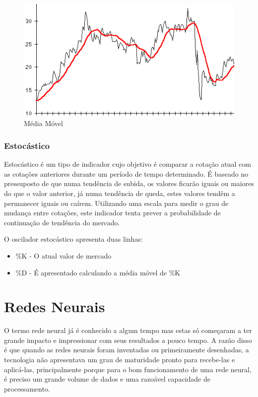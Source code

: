 \begin{figure}[h]
	\centering
	\includegraphics[keepaspectratio=true,scale=0.7]{figuras/mov.png}
	\caption{Média Móvel \cite{investopedia}}
	\label{fig07}
\end{figure}

\subsubsection{Estocástico}

Estocástico é um tipo de indicador cujo objetivo é comparar a cotação atual com as cotações anteriores durante um período de tempo determinado.
É baseado no pressuposto de que numa tendência de subida, os valores ficarão iguais ou maiores do que o valor anterior, já numa tendência
de queda, estes valores tendêm a permanecer iguais ou caírem. Utilizando uma escala para medir o grau de mudança entre cotações, este indicador tenta prever a probabilidade de continuação de tendência
do mercado. \cite{investopedia}

O oscilador estocástico apresenta duas linhas:

\begin{itemize}
  \item \%K - O atual valor de mercado
  \item \%D - É apresentado calculando a média móvel de \%K
\end{itemize}


\section{Redes Neurais}

O termo rede neural já é conhecido a algum tempo mas estas só começaram a ter grande impacto e impressionar com seus resultados
a pouco tempo. A razão disso é que quando as redes neurais foram inventadas ou primeiramente desenhadas, a tecnologia não apresentava
um grau de maturidade pronto para recebe-las e aplicá-las, principalmente porque para o bom funcionamento de uma rede neural, é preciso
um grande volume de dados e uma razoável capacidade de processamento. \cite{gross}

